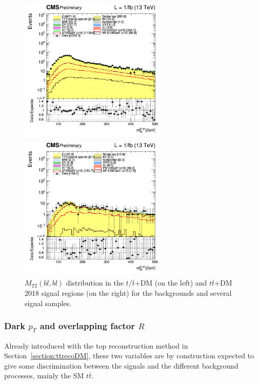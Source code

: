 \documentclass[a4paper, 10pt, openright]{report}
\begin{document}
\begin{figure}[htbp]
\centering
\begin{minipage}[b]{.48\textwidth}
\includegraphics[width=7cm, height=7cm]{figs/log_cratio_topCR_ll_2j_signal1_mt2bl.png}
\end{minipage}\hfill
\begin{minipage}[b]{.48\textwidth}
\includegraphics[width=7cm, height=7cm]{figs/log_cratio_topCR_ll_2j_signal0_mt2bl.png}
\end{minipage} \hfill
\caption{$M_{T2}(bl, bl)$ distribution in the $t/ \bar t$+DM (on the left) and $t \bar t$+DM 2018 signal regions (on the right) for the backgrounds and several signal samples.}
\label{fig:SRdiscMT2bl}
\end{figure}

\subsubsection*{Dark $p_T$ and overlapping factor $R$}

Already introduced with the top reconstruction method in Section~\ref{section:ttrecoDM}, these two variables are by construction expected to give some discrimination between the signals and the different background processes, mainly the \ac{SM} $t \bar t$. 
\end{document}
